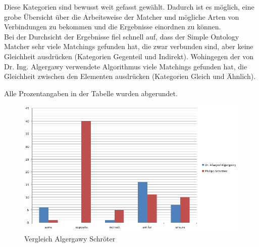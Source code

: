 		Diese Kategorien sind bewusst weit gefasst gewählt. Dadurch ist es
		möglich, eine grobe Übersicht über die Arbeitsweise der Matcher und mögliche
		Arten von Verbindungen zu bekommen und die Ergebnisse einordnen zu können.\\
		Bei der Durchsicht der Ergebnisse fiel schnell auf, dass der Simple Ontology
		Matcher sehr viele Matchings gefunden hat, die zwar verbunden sind, aber keine
		Gleichheit ausdrücken (Kategorien Gegenteil und Indirekt).
		Wohingegen der von Dr. Ing. Algergawy verwendete Algorithmus viele Matchings
		gefunden hat, die Gleichheit zwischen den Elementen ausdrücken (Kategorien
		Gleich und Ähnlich).\\
		
		\begin{center}
		\begin{table}[h!]
		\small
		\setlength\tabcolsep{2pt}
		\noindent{}
		\caption{Kategorisierte Ergebnisse}
		\end{table}
		\end{center}
		Alle Prozentangaben in der Tabelle wurden abgerundet.\\
				
		\begin{figure}[h!]
		\centering
		\includegraphics[width=1.0\textwidth]{pics/Vergleich-Algergawy-Schroeter_2016-11-22.png}
		\caption{Vergleich Algergawy Schröter}
		\label{fig16}
		\end{figure}
		
